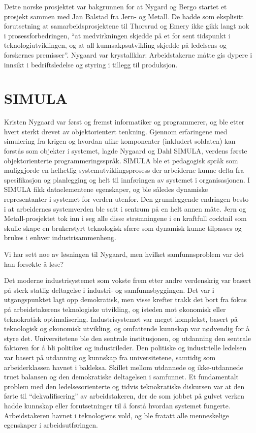 Dette norske prosjektet var bakgrunnen for at Nygard og Bergo startet et prosjekt sammen med Jan Balstad fra Jern- og Metall. De hadde som eksplisitt forutsetning at samarbeidsprosjektene til Thorsrud og Emery ikke gikk langt nok i prosessforbedringen, ``at medvirkningen skjedde på et for sent tidspunkt i teknologiutviklingen, og at all kunnsakpsutvikling skjedde på ledelsens og forskernes premisser''. Nygaard var krystallklar: Arbeidstakerne måtte gis dypere i innsikt i bedriftsledelse og styring i tillegg til produksjon.

\section{SIMULA}

Kristen Nygaard var først og fremst informatiker og programmerer, og ble etter hvert sterkt drevet av objektorientert tenkning. Gjennom erfaringene med simulering fra krigen og hvordan ulike komponenter (inkludert soldaten) kan forstås som objekter i systemet, lagde Nygaard og Dahl SIMULA, verdens første objektorienterte programmeringsspråk. SIMULA ble et pedagogisk språk som muliggjorde en helhetlig systemutviklingsprosess der arbeiderne kunne delta fra spesifikasjon og planlegging og helt til innføringen av systemet i organisasjonen. I SIMULA fikk dataelementene egenskaper, og ble således dynamiske representanter i systemet for verden utenfor. Den grunnleggende endringen besto i at arbeidernes systemverden ble satt i sentrum på en helt annen måte. Jern og Metall-prosjektet tok inn i seg alle disse strømningene i en kraftfull cocktail som skulle skape en brukerstyrt teknologisk sfære som dynamisk kunne tilpasses og brukes i enhver industrisammenheng.

Vi har sett noe av løsningen til Nygaard, men hvilket samfunnsproblem var det han forsøkte å løse?

Det moderne industrisystemet som vokste frem etter andre verdenskrig var basert på sterk statlig deltagelse i industri- og samfunnsbyggingen. Det var i utgangspunktet lagt opp demokratisk, men visse krefter trakk det bort fra fokus på arbeidstakerens teknologiske utvikling, og isteden mot økonomisk eller teknokratisk optimalisering. Industrisystemet var meget komplekst, basert på teknologisk og økonomisk utvikling, og omfattende kunnskap var nødvendig for å styre det. Universitetene ble den sentrale institusjonen, og utdanning den sentrale faktoren for å bli politiker og industrileder. Den politiske og industrielle ledelsen var basert på utdanning og kunnskap fra universitetene, samtidig som arbeiderklassen havnet i bakleksa. Skillet mellom utdannede og ikke-utdannede truet balansen og den demokratiske deltagelsen i samfunnet. Et fundamentalt problem med den ledelsesorienterte og tidvis teknokratiske diskursen var at den førte til ``dekvalifisering'' av arbeidstakeren, der de som jobbet på gulvet verken hadde kunnskap eller forutsetninger til å forstå hvordan systemet fungerte. Arbeidstakeren havnet i teknologiens vold, og ble fratatt alle menneskelige egenskaper i arbeidsutføringen.

